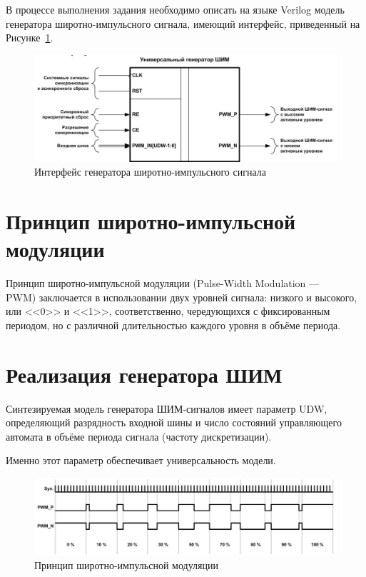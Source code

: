 В процессе выполнения задания необходимо описать на
языке Verilog модель генератора широтно-импульсного сигнала, имеющий интерфейс, приведенный на Рисунке~\ref{fig:pwm-interface}.

\begin{figure}[h!]
	\centering
	\includegraphics[width=0.55\linewidth]{course-plis/images/lab4/pwm-interface}
	\caption{Интерфейс генератора широтно-импульсного сигнала}
	\label{fig:pwm-interface}
\end{figure}


\section{Принцип широтно-импульсной модуляции}
Принцип широтно-импульсной модуляции (Pulse-Width
Modulation --- \\PWM) заключается в использовании двух уровней сигнала:
низкого и высокого, или <<0>> и <<1>>, соответственно, чередующихся с
фиксированным периодом, но с различной длительностью каждого уровня в
объёме периода.


\section{Реализация генератора ШИМ}


Синтезируемая модель генератора ШИМ-сигналов имеет параметр UDW,
определяющий разрядность входной шины и число состояний управляющего
автомата в объёме периода сигнала (частоту дискретизации). 

Именно этот
параметр обеспечивает универсальность модели.

\begin{figure}[h!]
	\centering
	\includegraphics[width=0.6\linewidth]{course-plis/images/lab4/5principe}
	\caption{Принцип широтно-импульсной модуляции}
	\label{fig:5principe}
\end{figure}


